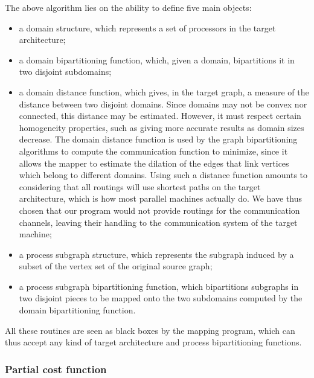 The above algorithm lies on the ability to define five main objects:
\begin{itemize}
\item
a domain structure, which represents a set of processors in the target
architecture;
\item
a domain bipartitioning function, which, given a domain, bipartitions
it in two disjoint subdomains;
\item
a domain distance function, which gives, in the target graph, a measure
of the distance between two disjoint domains. Since domains may not be convex
nor connected, this distance may be estimated.
However, it must respect certain homogeneity properties, such as
giving more accurate results as domain sizes decrease.
The domain distance function is used by the graph bipartitioning algorithms
to compute the communication function to minimize, since it allows the mapper
to estimate the dilation of the edges that link vertices which belong to
different domains.
Using such a distance function amounts to considering that all routings
will use shortest paths on the target architecture, which is how most
parallel machines actually do.
We have thus chosen that our program would not provide routings for the
communication channels, leaving their handling to the communication system of
the target machine;
\item
a process subgraph structure, which represents the subgraph induced by a
subset of the vertex set of the original source graph;
\item
a process subgraph bipartitioning function, which bipartitions subgraphs
in two disjoint pieces to be mapped onto the two subdomains computed by
the domain bipartitioning function.
\end{itemize}
All these routines are seen as black boxes by the mapping program, which can
thus accept any kind of target architecture and process bipartitioning
functions.

\subsubsection{Partial cost function}


